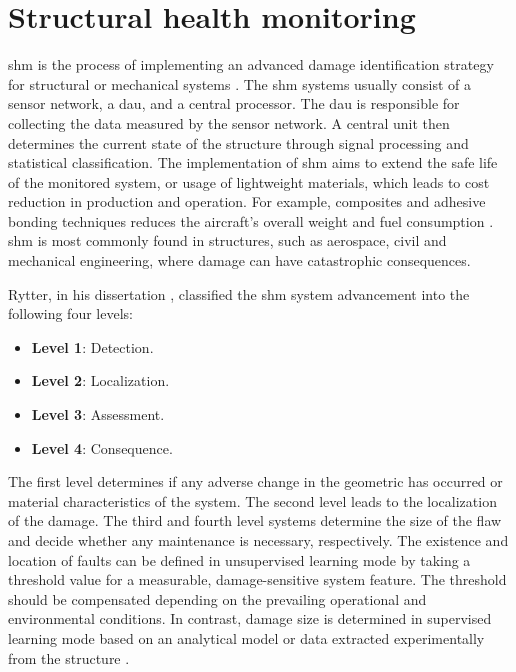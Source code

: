 \section{Structural health monitoring}
\label{sec:scm}

\Ac{shm} is the process of implementing an advanced damage identification strategy for structural or mechanical systems \cite{farrar2007introduction}.
The \ac{shm} systems usually consist of a sensor network, a \ac{dau}, and a central processor.
The \ac{dau} is responsible for collecting the data measured by the sensor network.
A central unit then determines the current state of the structure through signal processing and statistical classification.
The implementation of \ac{shm} aims to extend the safe life of the monitored system, or usage of lightweight materials, which leads to cost reduction in production and operation.
For example, composites and adhesive bonding techniques reduces the aircraft's overall weight and fuel consumption \cite{scelsi2011potential}.
\ac{shm} is most commonly found in structures, such as aerospace, civil and mechanical engineering, where damage can have catastrophic consequences.

Rytter, in his dissertation \cite{rytter1993vibrational}, classified the \ac{shm} system advancement into the following four levels:
\begin{itemize}
	\item[] \textbf{Level 1}: Detection.
	\item[] \textbf{Level 2}: Localization.
	\item[] \textbf{Level 3}: Assessment.
	\item[] \textbf{Level 4}: Consequence.
\end{itemize}
The first level determines if any adverse change in the geometric has occurred or material characteristics of the system. The second level leads to the localization of the damage.
The third and fourth level systems determine the size of the flaw and decide whether any maintenance is necessary, respectively.
The existence and location of faults can be defined in unsupervised learning mode by taking a threshold value for a measurable, damage-sensitive system feature. The threshold should be compensated depending on the prevailing operational and environmental conditions.
In contrast, damage size is determined in supervised learning mode based on an analytical model or data extracted experimentally from the structure \cite{worden2007fundamental}.